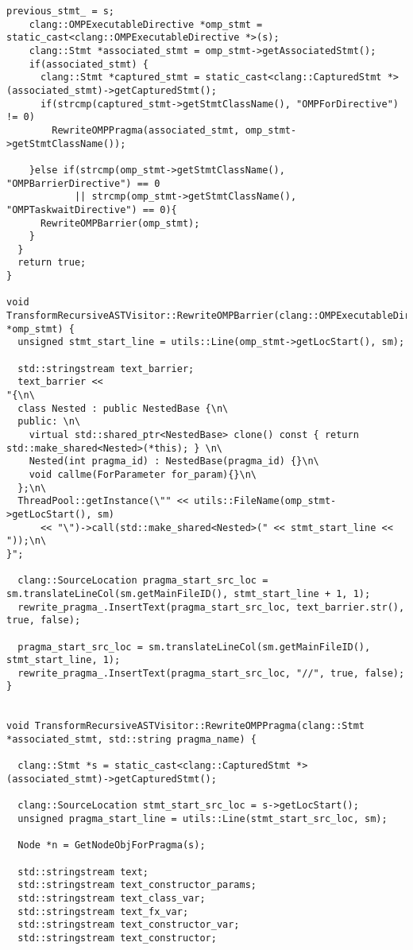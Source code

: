 \documentclass[a4paper,11pt,twoside]{book}
\begin{document}
\begin{lstlisting}[language=CCC, caption=driver/program.cpp]
    previous_stmt_ = s;
    clang::OMPExecutableDirective *omp_stmt = static_cast<clang::OMPExecutableDirective *>(s);
    clang::Stmt *associated_stmt = omp_stmt->getAssociatedStmt();
    if(associated_stmt) {
      clang::Stmt *captured_stmt = static_cast<clang::CapturedStmt *>(associated_stmt)->getCapturedStmt();
      if(strcmp(captured_stmt->getStmtClassName(), "OMPForDirective") != 0)
        RewriteOMPPragma(associated_stmt, omp_stmt->getStmtClassName());

    }else if(strcmp(omp_stmt->getStmtClassName(), "OMPBarrierDirective") == 0
            || strcmp(omp_stmt->getStmtClassName(), "OMPTaskwaitDirective") == 0){
      RewriteOMPBarrier(omp_stmt);
    }
  }
  return true;
}

void TransformRecursiveASTVisitor::RewriteOMPBarrier(clang::OMPExecutableDirective *omp_stmt) {
  unsigned stmt_start_line = utils::Line(omp_stmt->getLocStart(), sm);
  
  std::stringstream text_barrier;
  text_barrier <<
"{\n\
  class Nested : public NestedBase {\n\
  public: \n\
    virtual std::shared_ptr<NestedBase> clone() const { return std::make_shared<Nested>(*this); } \n\
    Nested(int pragma_id) : NestedBase(pragma_id) {}\n\
    void callme(ForParameter for_param){}\n\
  };\n\
  ThreadPool::getInstance(\"" << utils::FileName(omp_stmt->getLocStart(), sm) 
      << "\")->call(std::make_shared<Nested>(" << stmt_start_line << "));\n\
}";

  clang::SourceLocation pragma_start_src_loc = sm.translateLineCol(sm.getMainFileID(), stmt_start_line + 1, 1);
  rewrite_pragma_.InsertText(pragma_start_src_loc, text_barrier.str(), true, false);

  pragma_start_src_loc = sm.translateLineCol(sm.getMainFileID(), stmt_start_line, 1);
  rewrite_pragma_.InsertText(pragma_start_src_loc, "//", true, false);
}


void TransformRecursiveASTVisitor::RewriteOMPPragma(clang::Stmt *associated_stmt, std::string pragma_name) {
  
  clang::Stmt *s = static_cast<clang::CapturedStmt *>(associated_stmt)->getCapturedStmt();

  clang::SourceLocation stmt_start_src_loc = s->getLocStart();
  unsigned pragma_start_line = utils::Line(stmt_start_src_loc, sm);

  Node *n = GetNodeObjForPragma(s);
  
  std::stringstream text;
  std::stringstream text_constructor_params;
  std::stringstream text_class_var;
  std::stringstream text_fx_var;
  std::stringstream text_constructor_var;
  std::stringstream text_constructor;


\end{lstlisting}
\end{document}

